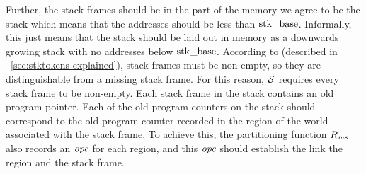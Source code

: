 \begin{jversion}
Further, the stack frames should be in the part of the memory we agree to be the stack which means that the addresses should be less than $\stkb$.
Informally, this just means that the stack should be laid out in memory as a downwards growing stack with no addresses below $\stkb$.
According to \stktokens{} (described in \sectionname~\ref{sec:stktokens-explained}), stack frames must be non-empty, so they are distinguishable from a missing stack frame.
For this reason, $\lrstk[]$ requires every stack frame to be non-empty.
Each stack frame in the \srccm{} stack contains an old program pointer.
Each of the old program counters on the stack should correspond to the old program counter recorded in the region of the world associated with the stack frame.
To achieve this, the partitioning function $R_\ms$ also records an $\opc$ for each region, and this $\opc$ should establish the link the region and the stack frame.


\end{jversion}

